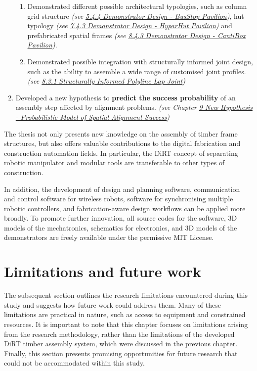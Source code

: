 \begin{enumerate}
\begin{enumerate}
	\item Demonstrated different possible architectural typologies, such as column grid structure \textit{(see \uline{5.4.4 Demonstrator Design - BusStop Pavilion})}, hut typology \textit{(see \uline{7.4.3 Demonstrator Design  - HyparHut Pavilion}) }and prefabricated spatial frames \textit{(see \uline{8.4.3 Demonstrator Design  - CantiBox Pavilion})}.

	\item Demonstrated possible integration with structurally informed joint design, such as the ability to assemble a wide range of customised joint profiles. \textit{(see \uline{8.3.1 Structurally Informed Polyline Lap Joint})}

\end{enumerate}
	\item Developed a new hypothesis to \textbf{predict the success probability} of an assembly step affected by alignment problems. \textit{(see Chapter \uline{9 New Hypothesis - Probabilistic Model of Spatial Alignment Success})}

\end{enumerate}
The thesis not only presents new knowledge on the assembly of timber frame structures, but also offers valuable contributions to the digital fabrication and construction automation fields. In particular, the DiRT concept of separating robotic manipulator and modular tools are transferable to other types of construction. 

In addition, the development of design and planning software, communication and control software for wireless robots, software for synchronising multiple robotic controllers, and fabrication-aware design workflows can be applied more broadly. To promote further innovation, all source codes for the software, 3D models of the mechatronics, schematics for electronics, and 3D models of the demonstrators are freely available under the permissive MIT License. 

\section{Limitations and future work}

The subsequent section outlines the research limitations encountered during this study and suggests how future work could address them. Many of these limitations are practical in nature, such as access to equipment and constrained resources. It is important to note that this chapter focuses on limitations arising from the research methodology, rather than the limitations of the developed DiRT timber assembly system, which were discussed in the previous chapter. Finally, this section presents promising opportunities for future research that could not be accommodated within this study.

